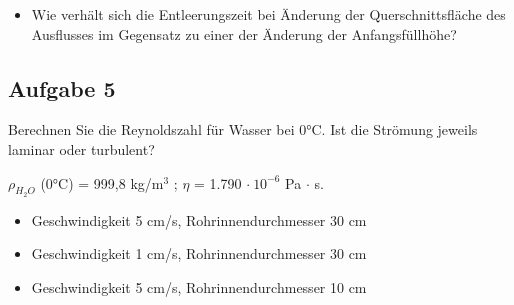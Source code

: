 \documentclass[a4paper,11pt]{article}
\newif\ifshowme
\begin{document}
\begin{marginfigure}[+2cm]
\begin{itemize}
{\begin{align*}
t &= \sqrt{\frac{2}{g}} \cdot \frac{A_1}{A_2} \cdot \left(\sqrt{h_{\alpha}} - \sqrt{h_w} \right) \\
 &= \sqrt{\frac{2}{9,81~\text{m/s}^2}} \cdot \frac{1.963,5~\text{cm}^2}{0,03~\text{cm}^2} \cdot \left(\sqrt{1,0186~\text{m}} - 0 \right) \\
 &= 29.825,79~\text{s} \qquad \approx 8,28~\text{h}
\end{align*}
Das Fass mit dem kleinen Leck ist nach 8 Stunden noch nicht komplett entleert.
\begin{align*}
t &= \sqrt{\frac{2}{9,81~\text{m/s}^2}} \cdot \frac{1.963,5~\text{cm}^2}{0,05~\text{cm}^2} \cdot \left(\sqrt{1,0186~\text{m}} - 0 \right) \\
 &= 17.895,48~\text{s} \qquad \approx 4,97~\text{h}
\end{align*}
Das Fass mit dem größeren Leck ist bereits nach guten 5 Stunden komplett entleert.
}
\else
\fi 
\item Wie verhält sich die Entleerungszeit bei Änderung der Querschnittsfläche des Ausflusses im Gegensatz zu einer der Änderung der Anfangsfüllhöhe?


\ifshowme
\antwort{Die Entleerungszeit verhält sich umgekehrt proportional zur Querschnittsfläche des Ausflusses, während sie proportional zur Füllhöhe der Wurzel ist. \pp 
Eine Verdopplung der Entleerungszeit bedeutet eine \textbf{Vervierfachung} der Füllhöhe. \par 
Eine Verdopplung der Entleerungszeit bedeutet eine \textbf{Halbierung} der Ausflussfläche. }


\pagebreak
\else
\fi 

\end{itemize}






\subsection*{Aufgabe 5}
Berechnen Sie die Reynoldszahl für Wasser bei 0°C. Ist die Strömung jeweils laminar oder turbulent?

$\rho_{H_2O}$ (0°C) = 999,8 kg/m$^3$ ; $\eta$ = 1.790 $\cdot ~ 10^{-6}$ Pa $\cdot$ s. 

\begin{itemize}
       \item Geschwindigkeit 5 cm/s, Rohrinnendurchmesser 30 cm
       \item Geschwindigkeit 1 cm/s, Rohrinnendurchmesser 30 cm
       \item Geschwindigkeit 5 cm/s, Rohrinnendurchmesser 10 cm
\end{itemize}




\end{marginfigure}
\end{document}

